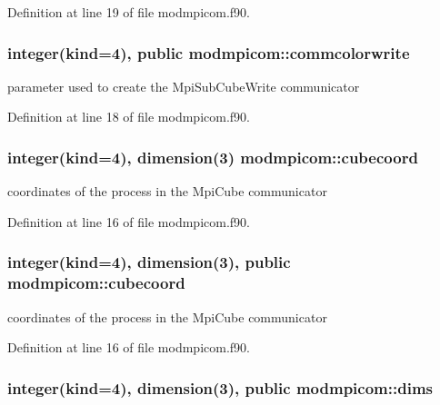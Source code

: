 Definition at line 19 of file modmpicom.\-f90.

\hypertarget{classmodmpicom_ac492fd7b2b0e1274ab259b5377a8a907}{
\subsubsection[{commcolorwrite}]{\setlength{\rightskip}{0pt plus 5cm}integer(kind=4), public modmpicom\-::commcolorwrite}}\label{classmodmpicom_ac492fd7b2b0e1274ab259b5377a8a907}


parameter used to create the Mpi\-Sub\-Cube\-Write communicator 



Definition at line 18 of file modmpicom.\-f90.

\hypertarget{classmodmpicom_a533718abb8ce3f03b430dfbf9f821069}{
\subsubsection[{cubecoord}]{\setlength{\rightskip}{0pt plus 5cm}integer(kind=4), dimension(3) modmpicom\-::cubecoord}}\label{classmodmpicom_a533718abb8ce3f03b430dfbf9f821069}


coordinates of the process in the Mpi\-Cube communicator 



Definition at line 16 of file modmpicom.\-f90.

\hypertarget{classmodmpicom_a82b7ffcc29d150ab9a64cbf53757feca}{
\subsubsection[{cubecoord}]{\setlength{\rightskip}{0pt plus 5cm}integer(kind=4), dimension(3), public modmpicom\-::cubecoord}}\label{classmodmpicom_a82b7ffcc29d150ab9a64cbf53757feca}


coordinates of the process in the Mpi\-Cube communicator 



Definition at line 16 of file modmpicom.\-f90.

\hypertarget{classmodmpicom_ab53b6d73e6ad2ed312af8e9fcacdcd39}{
\subsubsection[{dims}]{\setlength{\rightskip}{0pt plus 5cm}integer(kind=4), dimension(3), public modmpicom\-::dims}}\label{classmodmpicom_ab53b6d73e6ad2ed312af8e9fcacdcd39}


